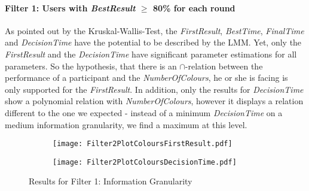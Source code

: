 \paragraph{Filter 1: Users with \textit{BestResult} $\geq$ 80\% for each round}
As pointed out by the Kruskal-Wallis-Test, the \textit{FirstResult}, \textit{BestTime}, \textit{FinalTime} and \textit{DecisionTime} have the potential to be described by the \ac{LMM}. Yet, only the \textit{FirstResult} and the \textit{DecisionTime} have significant parameter estimations for all parameters. So the hypothesis, that there is an \textbf{$\cap$}-relation between the performance of a participant and the \textit{NumberOfColours}, he or she is facing is only supported for the \textit{FirstResult}. In addition, only the results for \textit{DecisionTime} show a polynomial relation with \textit{NumberOfColours}, however it displays a relation different to the one we expected -  instead of a minimum \textit{DecisionTime} on a medium information granularity, we find a maximum at this level.
\begin{figure}[H] %
\begin{center}
\begin{subfigure} 
\centering
\texttt{[image: Filter2PlotColoursFirstResult.pdf]}
\end{subfigure} 
\begin{subfigure}
\centering
\texttt{[image: Filter2PlotColoursDecisionTime.pdf]}
\end{subfigure}   
  \caption[Results for Filter 1: Information Granularity]{Results for Filter 1: Information Granularity\footnotemark}
    \label{fig:Results for Filter 1: Information Granularity} 
\end{center}
\end{figure}


